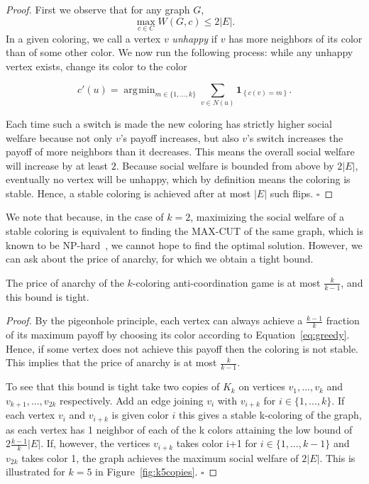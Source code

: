 \documentclass{llncs}
\newcommand{\ind}[1]{\textbf{1}_{\left \{ #1 \right \}}}
\DeclareMathOperator*{\argmin}{\arg\!\min}
\begin{document}
\begin{proof}
First we observe that for any graph $G$, $$\max_{c \in C} W(G,c) \leq 2|E|.$$
In a given coloring, we call a vertex $v$ \emph{unhappy} if $v$ has more
neighbors of its color than of some other color.  We now run the following
process: while any unhappy vertex exists, change its color to the color

\begin{equation}\label{eq:greedy}
c'(u) = \argmin_{m \in \{1, \ldots, k\}} \sum_{ v \in N(u)}\ind{c(v) = m}.
\end{equation}

Each time such a switch is made the new coloring has strictly higher social
welfare because not only $v$'s payoff increases, but also $v$'s switch
increases the payoff of more neighbors than it decreases.  
This means the overall social welfare will increase by at 
least $2$.
Because social welfare is bounded from above by $2|E|$, eventually no vertex will be
unhappy, which by definition means the coloring is stable.
Hence, a stable coloring is achieved after at most $|E|$ such flips.
\hfill $\square$
\end{proof}

We note that because, in the case of $k=2$,
maximizing the social welfare of a stable coloring 
is equivalent to finding the MAX-CUT of the same graph, which is known to be
NP-hard~\cite{GareyJ79}, we cannot hope to find the optimal solution.  However,
we can ask about the price of anarchy, for which we obtain a tight bound.

\begin{theorem}
The price of anarchy of the $k$-coloring anti-coordination game is at most
$\frac{k}{k-1}$, and this bound is tight.
\end{theorem}

\begin{proof}
By the pigeonhole principle,
each vertex can always achieve a $\frac{k-1}{k}$ fraction of its maximum payoff by
choosing its color according to Equation~\ref{eq:greedy}.  Hence, if some
vertex does not achieve this payoff then the coloring is not stable.  This implies that the price of anarchy is at most
$\frac{k}{k-1}$.

To see that this bound is tight take two copies of $K_k$ on vertices $v_1, ...,
v_k$ and $v_{k+1}, ..., v_{2k}$ respectively. Add an edge joining $v_i$ with
$v_{i+k}$ for $i\in \{1,...,k\}$. If each vertex $v_i$ and $v_{i+k}$ is given
color $i$ this gives a stable k-coloring of the graph, as each vertex has 1
neighbor of each of the k colors attaining the low bound of
$2\frac{k-1}{k}|E|$. If, however, the vertices $v_{i+k}$ takes color i+1 for
$i\in\{1,...,k-1\}$ and $v_{2k}$ takes color 1, the graph achieves the maximum
social welfare of $2|E|$.  This is illustrated for $k=5$ in
Figure~\ref{fig:k5copies}.
$\square$\end{proof}
\end{document}
